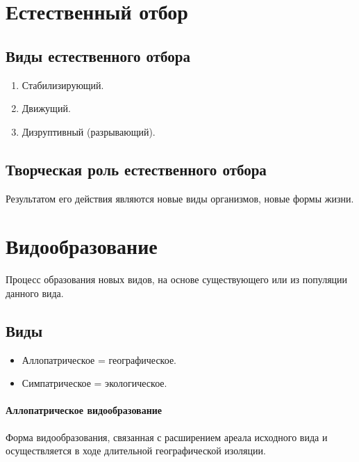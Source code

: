 \documentclass[12pt]{article}
\begin{document}
	\section{Естественный отбор}
	
	\subsection{Виды естественного отбора}
	
	\begin{enumerate}
		\item Стабилизирующий.
		\item Движущий.
		\item Дизруптивный (разрывающий).
	\end{enumerate}
	
	\subsection{Творческая роль естественного отбора}
	
	Результатом его действия являются новые виды организмов, новые формы жизни.
	
	\section{Видообразование}
	
	\begin{definition}[Видообразование]
		Процесс образования новых видов, на основе существующего или из популяции данного вида.
	\end{definition}
	
	\subsection{Виды}
	\begin{itemize}
		\item Аллопатрическое = географическое.
		\item Симпатрическое = экологическое.
	\end{itemize}
	
	\paragraph{Аллопатрическое видообразование}
	
	Форма видообразования, связанная с расширением ареала исходного вида и осуществляется в ходе длительной географической изоляции.
	
\end{document}
